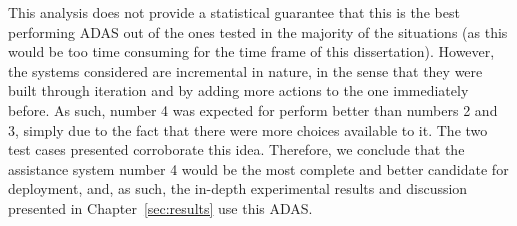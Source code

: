This analysis does not provide a statistical guarantee that this is the best performing ADAS out of the ones tested in the majority of the situations (as this would be too time consuming for the time frame of this dissertation). However, the systems considered are incremental in nature, in the sense that they were built through iteration and by adding more actions to the one immediately before. As such, number 4 was expected for perform better than numbers 2 and 3, simply due to the fact that there were more choices available to it. The two test cases presented corroborate this idea. Therefore, we conclude that the assistance system number 4 would be the most complete and better candidate for deployment, and, as such, the in-depth experimental results and discussion presented in Chapter~\ref{sec:results} use this ADAS.
